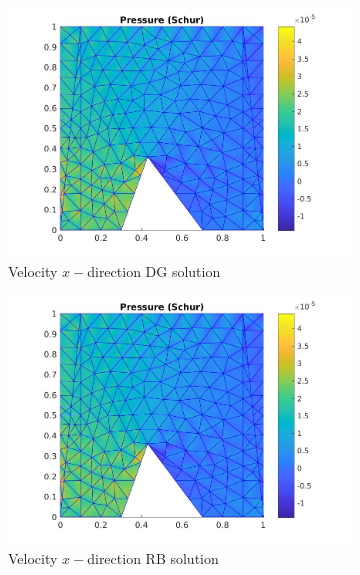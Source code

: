 \documentclass[graybox]{svmult}
\begin{document}
\begin{figure}%
\begin{subfigure}{\textwidth}
\includegraphics[width=\linewidth]{offline_pressure_at_43_36.jpg}
\caption{Velocity $x-$direction DG solution} \label{vel_x_dg}
\end{subfigure}\hspace*{\fill}
\begin{subfigure}{0.31\textwidth}
\includegraphics[width=\linewidth]{offline_pressure_at_43_36.jpg}
\caption{Velocity $x-$direction RB solution} \label{vel_x_rb}
\end{subfigure}
\begin{subfigure}{0.31\textwidth}

\end{subfigure}
\end{figure}
\end{document}
